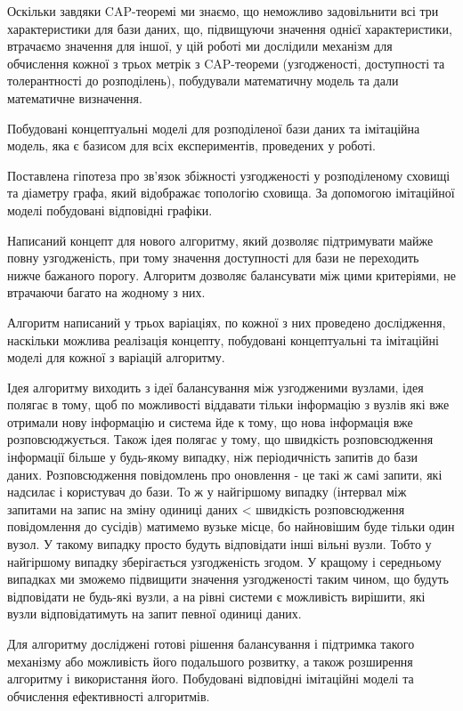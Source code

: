 \documentclass[14pt]{vakthesis}
\begin{document}
Оскільки завдяки CAP-теоремі ми знаємо, що неможливо задовільнити всі три характеристики для бази даних, що, підвищуючи значення однієї характеристики,
втрачаємо значення
для іншої, у цій роботі ми дослідили механізм для обчислення кожної з трьох метрік з CAP-теореми
(узгодженості, доступності та толерантності до розподілень), побудували математичну модель та дали математичне визначення.

Побудовані концептуальні моделі для розподіленої бази даних та імітаційна модель, яка є базисом для всіх експериментів, проведених
у роботі.


Поставлена гіпотеза про зв'язок збіжності узгодженості у розподіленому сховищі та діаметру графа, який відображає топологію сховища.
За допомогою імітаційної моделі побудовані відповідні графіки.


Написаний концепт для нового алгоритму, який дозволяє підтримувати майже повну узгодженість, при тому значення доступності для бази
не переходить нижче бажаного порогу. Алгоритм дозволяє балансувати між цими критеріями, не втрачаючи багато на жодному з них.

Алгоритм написаний у трьох варіаціях, по кожної з них проведено дослідження, наскільки можлива реалізація концепту, побудовані концептуальні
та імітаційні моделі для кожної з варіацій алгоритму.

Ідея алгоритму виходить з ідеї балансування між узгодженими вузлами, ідея полягає в тому, щоб по можливості віддавати тільки інформацію з
вузлів які вже отримали нову інформацію и система йде к тому, що нова інформація вже розповсюджується.
Також ідея полягає у тому, що швидкість розповсюдження інформації більше у будь-якому випадку, ніж періодичність запитів до бази даних.
Розповсюдження повідомлень про оновлення - це такі ж самі запити, які надсилає і користувач до бази. То ж у найгіршому випадку
(інтервал між запитами на запис на зміну одиниці даних < швидкість розповсюдження повідомлення до сусідів) матимемо вузьке місце, бо найновішим
буде тільки один вузол. У такому випадку просто будуть відповідати інші вільні вузли. Тобто у найгіршому випадку зберігається узгодженість згодом.
У кращому і середньому випадках ми зможемо підвищити значення узгодженості таким чином, що будуть відповідати не будь-які вузли, а на рівні системи
є можливість вирішити, які вузли відповідатимуть на  запит певної одиниці даних.

Для алгоритму досліджені готові рішення балансування і підтримка такого механізму або можливість його подальшого розвитку, а також розширення алгоритму
і використання його. Побудовані відповідні імітаційні моделі та обчислення ефективності алгоритмів.
\end{document}

